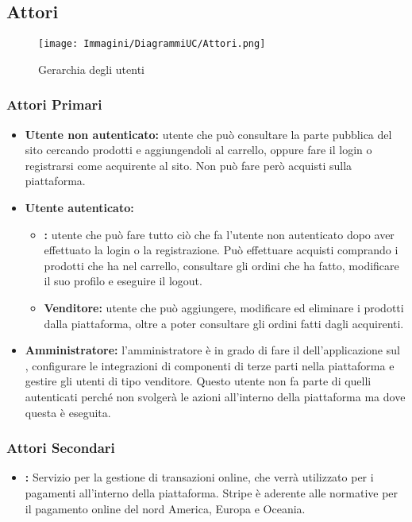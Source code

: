 \subsection{Attori} \label{Attori}

\begin{figure}[ht]
    \centering
    \texttt{[image: Immagini/DiagrammiUC/Attori.png]}
    \caption{Gerarchia degli utenti} 
    \label{fig:Registrazione}
\end{figure}

\subsubsection{Attori Primari}
\begin{itemize}
    \item \textbf{Utente non autenticato:} utente che può consultare la parte pubblica del sito cercando prodotti e aggiungendoli al carrello, oppure fare il login o registrarsi come acquirente al sito. Non può fare però acquisti sulla piattaforma.
    \item \textbf{Utente autenticato:}
    \begin{itemize}
        \item \textbf{:} utente che può fare tutto ciò che fa l'utente non autenticato dopo aver effettuato la login o la registrazione. Può effettuare acquisti comprando i prodotti che ha nel carrello, consultare gli ordini che ha fatto, modificare il suo profilo e eseguire il logout.
        \item \textbf{Venditore:} utente che può aggiungere, modificare ed eliminare i prodotti dalla piattaforma, oltre a poter consultare gli ordini fatti dagli acquirenti.
    \end{itemize}
    \item \textbf{Amministratore:} l'amministratore è in grado di fare il  dell'applicazione sul , configurare le integrazioni di componenti di terze parti nella piattaforma e gestire gli utenti di tipo venditore. Questo utente non fa parte di quelli autenticati perché non svolgerà le azioni all'interno della piattaforma ma dove questa è eseguita.
\end{itemize}
\subsubsection{Attori Secondari}
\begin{itemize}
\item \textbf{:} Servizio per la gestione di transazioni online, che verrà utilizzato per i pagamenti all'interno della piattaforma. Stripe è aderente alle normative per il pagamento online del nord America, Europa e Oceania.
\end{itemize}

